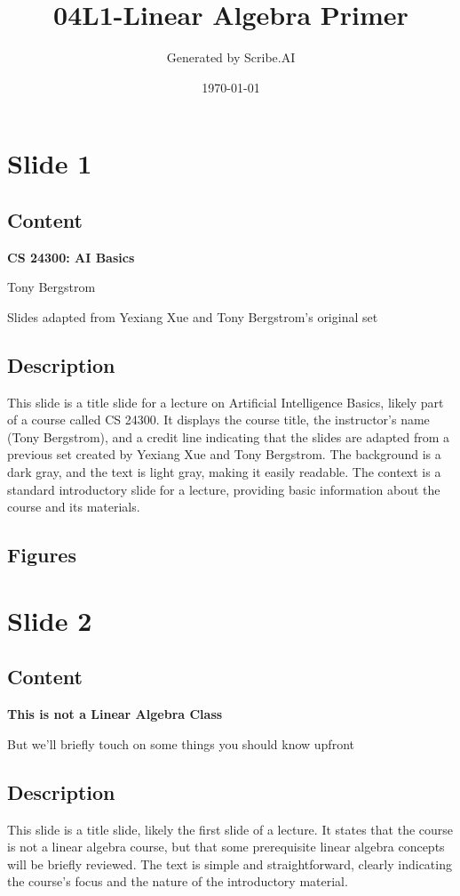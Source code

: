 \documentclass{article}%
\title{04L1{-}Linear Algebra Primer}%
\author{Generated by Scribe.AI}%
\date{\today}%
\begin{document}
%
\normalsize%
\maketitle%
\section{Slide 1}%
\label{sec:Slide1}%
\subsection{Content}%

\textbf{CS 24300: AI Basics}

Tony Bergstrom

Slides adapted from Yexiang Xue and Tony Bergstrom's original set
%
\subsection{Description}%
This slide is a title slide for a lecture on Artificial Intelligence Basics, likely part of a course called CS 24300.  It displays the course title, the instructor's name (Tony Bergstrom), and a credit line indicating that the slides are adapted from a previous set created by Yexiang Xue and Tony Bergstrom.  The background is a dark gray, and the text is light gray, making it easily readable.  The context is a standard introductory slide for a lecture, providing basic information about the course and its materials.%
\subsection{Figures}%
\begin{figure}[H]%
\centering%
\end{figure}

%
\newpage%
\section{Slide 2}%
\label{sec:Slide2}%
\subsection{Content}%

\textbf{This is not a Linear Algebra Class}

But we'll briefly touch on some things you should know upfront
%
\subsection{Description}%
This slide is a title slide, likely the first slide of a lecture. It states that the course is not a linear algebra course, but that some prerequisite linear algebra concepts will be briefly reviewed.  The text is simple and straightforward, clearly indicating the course's focus and the nature of the introductory material.%
\end{document}
